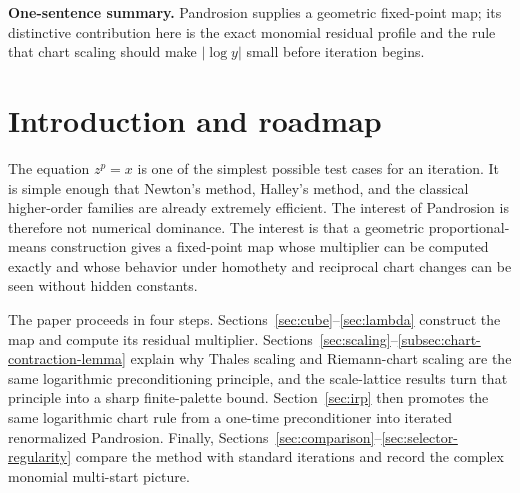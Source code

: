 \documentclass[10pt,a4paper]{article}
\theoremstyle{plain}
\theoremstyle{definition}
\theoremstyle{remark}
\newenvironment{takeaway}{%
  \begin{center}\begin{minipage}{0.92\linewidth}\small\itshape\color{blue!45!black}%
}{%
  \end{minipage}\end{center}%
}
\begin{document}
\begin{abstract}
Finally, the same logarithmic principle leads to an intrinsic acceleration mechanism called Iterated Renormalized Pandrosion (IRP).  Instead of applying an external Aitken--Steffensen or Halley correction, IRP repeatedly recomputes the residual chart, snaps it to a small logarithmic scale cell, applies one raw Pandrosion layer, and returns to the root coordinate.  In the local continuous model one renormalized raw layer is quadratic in the logarithmic root error, and iterating the layer gives dyadic order amplification: $k$ renormalized layers have local order $2^k$.  The complex monomial extension is kept at the level needed for an expository account: cyclotomic anchors, local seeding regions, and a finite selector.  The result is a deliberately narrow but coherent account of the Pandrosion monomial scheme: fixed point, contraction, scaling, reciprocal charts, iterated renormalization, and complex roots.
\end{abstract}

\begin{takeaway}
\textbf{One-sentence summary.}
Pandrosion supplies a geometric fixed-point map; its distinctive contribution here is the exact monomial residual profile and the rule that chart scaling should make $|\log y|$ small before iteration begins.
\end{takeaway}

\clearpage
\renewcommand{\contentsname}{Sommaire}
\tableofcontents
\clearpage


\section{Introduction and roadmap}
\label{sec:intro}

The equation $z^p=x$ is one of the simplest possible test cases for an
iteration.  It is simple enough that Newton's method, Halley's method, and the
classical higher-order families are already extremely efficient.  The interest
of Pandrosion is therefore not numerical dominance.  The interest is that a
geometric proportional-means construction gives a fixed-point map whose
multiplier can be computed exactly and whose behavior under homothety and
reciprocal chart changes can be seen without hidden constants.

The paper proceeds in four steps.  Sections~\ref{sec:cube}--\ref{sec:lambda}
construct the map and compute its residual multiplier.  Sections~\ref{sec:scaling}--\ref{subsec:chart-contraction-lemma}
explain why Thales scaling and Riemann-chart scaling are the same logarithmic
preconditioning principle, and the scale-lattice results turn that principle
into a sharp finite-palette bound.  Section~\ref{sec:irp} then promotes the
same logarithmic chart rule from a one-time preconditioner into iterated
renormalized Pandrosion.  Finally, Sections~\ref{sec:comparison}--\ref{sec:selector-regularity}
compare the method with standard iterations and record the complex monomial
multi-start picture.
\end{document}
